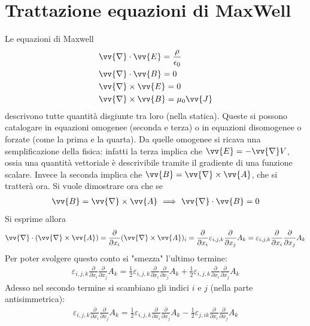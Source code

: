 \documentclass[a4paper, oneside]{article}
\begin{document}
\section{Trattazione equazioni di MaxWell}
Le equazioni di Maxwell
\begin{align}
    &\vv{\nabla} \cdot \vv{E} = \frac{\rho}{\epsilon_0} \\
    &\vv{\nabla} \cdot \vv{B} = 0 \\
    &\vv{\nabla} \times \vv{E}= 0 \\
    &\vv{\nabla} \times \vv{B} = \mu_0 \vv{J}         
\end{align}
descrivono tutte quantità disgiunte tra loro (nella statica). Queste si possono 
catalogare in equazioni omogenee (seconda e terza) o in equazioni disomogenee o forzate (come 
la prima e la quarta). Da quelle omogenee si ricava una semplificazione 
della fisica: infatti la terza implica che $\vv{E} = - \vv{\nabla}V$, ossia 
una quantità vettoriale è descrivibile tramite il gradiente di una funzione scalare. 
Invece la seconda implica che $\vv{B} = \vv{\nabla} \times \vv{A}$, che si tratterà ora.    
Si vuole dimostrare ora che se
\begin{gather*}
    \vv{B} = \vv{\nabla} \times \vv{A} \ \Longrightarrow \ \vv{\nabla} \cdot \vv{B} = 0     
\end{gather*}
Si esprime allora 
\begin{gather*}
    \vv{\nabla} \cdot (\vv{\nabla} \times \vv{A}  ) = \frac{\partial }{\partial x_i} (\vv{\nabla} \times \vv{A}  )_i = \frac{\partial }{\partial x_i}\varepsilon_{i, j, k} \frac{\partial }{\partial x_j} A_k = \varepsilon_{i,j, k} \frac{\partial }{\partial x_i} \frac{\partial }{\partial x_j}A_k      
\end{gather*}
Per poter svolgere questo conto si "smezza" l'ultimo termine: 
\begin{gather*}
    \varepsilon_{i,j, k} \frac{\partial }{\partial x_i} \frac{\partial }{\partial x_j}A_k  = \frac{1}{2} \varepsilon_{i,j, k} \frac{\partial }{\partial x_i} \frac{\partial }{\partial x_j}A_k  + \frac{1}{2} \varepsilon_{i,j, k} \frac{\partial }{\partial x_i} \frac{\partial }{\partial x_j}A_k  
\end{gather*} 
Adesso nel secondo termine si scambiano gli indici $i$ e $j$ (nella parte antisimmetrica):
\begin{gather*}
    \varepsilon_{i,j, k} \frac{\partial }{\partial x_i} \frac{\partial }{\partial x_j}A_k  = \frac{1}{2} \varepsilon_{i,j, k} \frac{\partial }{\partial x_i} \frac{\partial }{\partial x_j}A_k  - \frac{1}{2} \varepsilon_{j, i k} \frac{\partial }{\partial x_i} \frac{\partial }{\partial x_j}A_k  
\end{gather*}
\end{document}
